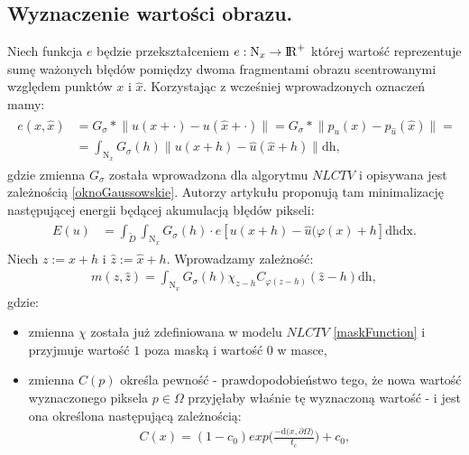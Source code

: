 \documentclass[12pt, twoside, openany]{report}
\theoremstyle{definition}
\begin{document}
\subsection{Wyznaczenie wartości obrazu.}
Niech funkcja $e$  będzie przekształceniem $e: \mathrm{N}_x \rightarrow {\rm I\!R}^{+}$ której wartość reprezentuje sumę ważonych błędów pomiędzy dwoma fragmentami obrazu scentrowanymi względem punktów $x$ i $\hat{x}$. Korzystając z wcześniej wprowadzonych oznaczeń mamy:
\begin{align}
\begin{aligned}
e(x, \hat{x}) &= G_\sigma \ast \big\| u(x + \cdot) - u(\hat{x} + \cdot) \big\| = G_\sigma \ast \big\| p_{u}(x) - p_{\hat{u}}(\hat{x}) \big\| = \\ 
&= \int_{\mathrm{N}_x} G_\sigma(h) \big\| u(x+h) - \hat{u}(\hat{x} +h) \big\|\mathrm{dh},
\label{minUs}
\end{aligned}
\end{align}
gdzie zmienna $G_{\sigma}$ została wprowadzona dla algorytmu $NLCTV$ i opisywana jest zależnością \eqref{oknoGaussowskie}. Autorzy artykułu \cite{arias2011variational} proponują tam minimalizację następującej energii będącej akumulacją błędów pikseli:
\begin{align}
\begin{aligned}
E(u) &= \int_{\widetilde D}\int_{\mathrm{N}_x}G_\sigma(h)\cdot e \left[ u(x+h) - \hat{u}(\varphi(x)+h\right]\mathrm{dhdx}.
\label{patchMatchEnergy}
\end{aligned}
\end{align} 
Niech $z := x+h$ i $\hat{z} := \hat{x}+h$. Wprowadzamy zależność:
\begin{align}
m(z,\hat{z}) = \int_{\mathrm{N}_x}G_\sigma(h)\chi_{z-h}C_{\varphi(z-h)}(\hat{z}-h)\mathrm{dh},
\end{align}
gdzie:
\begin{itemize}
\item
zmienna $\chi$ została już zdefiniowana w modelu $NLCTV$ \eqref{maskFunction} i przyjmuje wartość $1$ poza maską i wartość $0$ w masce,
\item
zmienna $C(p)$ określa pewność - prawdopodobieństwo tego, że nowa wartość wyznaczonego piksela $p \in \Omega$ przyjęłaby właśnie tę wyznaczoną wartość - i jest ona określona następującą zależnością:
\begin{align}
C(x)=(1-c_0)exp\bigg(\frac{-\mathrm{d}\bigl(x,\partial\Omega\bigr)}{t_c}\bigg) + c_0,
\label{pewnoscVFI}
\end{align}
\end{itemize}
\end{document}
